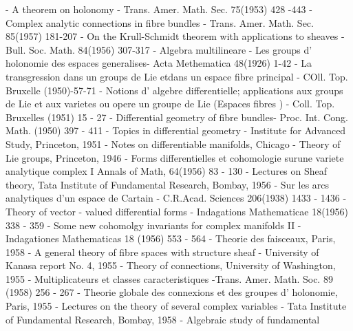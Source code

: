 \begin{thebibliography}{99}
\pageoriginale - A theorem on holonomy -
  Trans. Amer. Math. Sec. 75(1953) 428 -443 
 - Complex analytic connections in fibre
  bundles - Trans. Amer. Math. Sec. 85(1957) 181-207 
 - On the Krull-Schmidt theorem with applications to
  sheaves - Bull. Soc. Math. 84(1956) 307-317 
 - Algebra multilineare
 - Les groups d' holonomie des espaces
  generalises- Acta Methematica 48(1926) 1-42 
 - La transgression dans un groups de Lie etdans
  un espace fibre principal - COll.  Top. Bruxelle (1950)-57-71 
 - Notions d' algebre differentielle; applications aux
  groups de Lie et aux varietes ou opere un groupe de Lie (Espaces
  fibres ) - Coll. Top. Bruxelles (1951) 15 - 27 
 - Differential geometry of fibre bundles-
  Proc. Int. Cong. Math. (1950) 397 - 411  
\pageoriginale - Topics in differential geometry - Institute
  for Advanced Study, Princeton, 1951 
 - Notes on differentiable manifolds, Chicago
 - Theory of Lie groups, Princeton, 1946
 - Forms differentielles et cohomologie
  surune variete analytique complex I Annals of Math, 64(1956) 83 -
  130 
 - Lectures on Sheaf theory, Tata Institute
  of Fundamental Research, Bombay, 1956 
 - Sur les arcs analytiques d'un espace de
  Cartain - C.R.Acad. Sciences 206(1938) 1433 - 1436 
 - Theory of vector -
  valued differential forms - Indagations Mathematicae 18(1956) 338 -
  359 
 - Some new cohomolgy invariants for complex manifolds
  II - Indagationes Mathematicas 18 (1956) 553 - 564 
 - Theorie des faisceaux, Paris, 1958 
 - A general theory of fibre spaces with
  structure sheaf - University of Kanasa report No. 4, 1955 
 - Theory of connections, University of
  Washington, 1955 
\pageoriginale - Multiplicateurs et classes
  caracteristiques -Trans. Amer. Math. Soc. 89 (1958) 256 - 267 
 - Theorie globale des connexions et des
  groupes d' holonomie, Paris, 1955 
 - Lectures on the theory of several complex
  variables - Tata Institute of Fundamental Research, Bombay, 1958 
 - Algebraic study of fundamental

\end{thebibliography}
